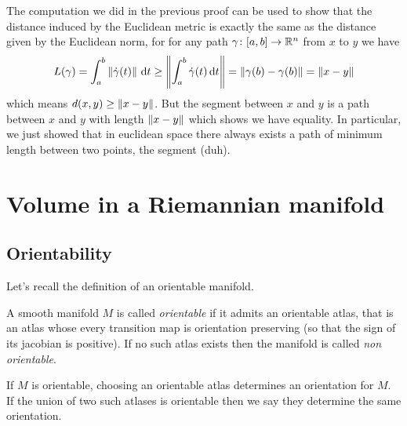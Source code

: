 \documentclass[12pt,twoside]{book}
\begin{document}
The computation we did in the previous proof can be used to show that the distance induced
by the Euclidean metric is exactly the same as the distance given by the Euclidean norm,
for for any path \( \gamma \colon [a,b] \to \mathbb{R}^n \) from \( x \) to \( y \) we have
\begin{align*}
	L(\gamma) = \int_a^b \left\lVert \dot{\gamma}(t) \right\rVert\, \mathrm{d} t \geq \left\lVert \int_a^b \dot{\gamma}(t) \, \mathrm{d}
	t \right\rVert = \left\lVert \gamma(b) - \gamma(b) \right\rVert = \left\lVert x - y \right\rVert
\end{align*}
which means \( d(x,y) \geq \left\lVert x - y \right\rVert \). But the segment between \( x \) and \( y \) is
a path between \( x \) and \( y \) with length \( \left\lVert x- y \right\rVert \) which shows we have
equality. In particular, we just showed that in euclidean space there always exists a path
of minimum length between two points, the segment (duh). 

\section{Volume in a Riemannian manifold}
\subsection{Orientability}
Let's recall the definition of an orientable manifold.
\begin{definition}
	A smooth manifold \( M \) is called \emph{orientable} if it admits an orientable atlas,
	that is an atlas whose every transition map is orientation preserving (so that the sign
	of its jacobian is positive). If no such atlas exists then the manifold is called
	\emph{non orientable}.

	If \( M \) is orientable, choosing an orientable atlas determines an orientation for \(
	M\). If the union of two such atlases is orientable then we say they determine the same
	orientation. 
\end{definition}
\end{document}
